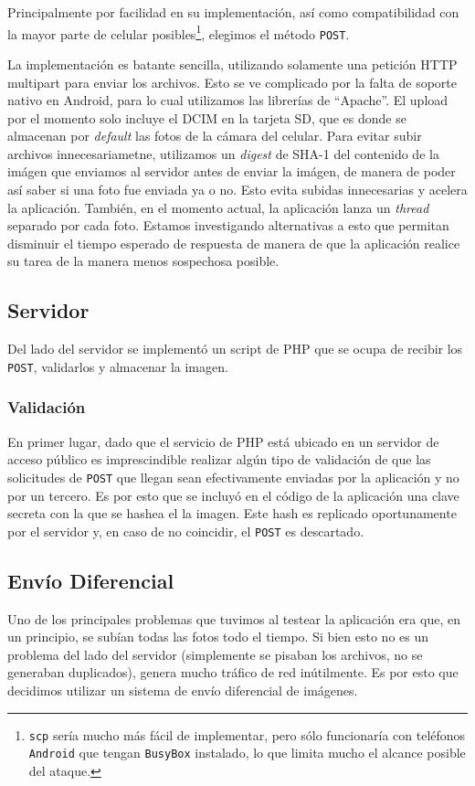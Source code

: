 Principalmente por facilidad en su implementación, así como compatibilidad con la mayor parte de celular posibles\footnote{\texttt{scp} sería mucho más fácil de implementar, pero sólo funcionaría con teléfonos \texttt{Android} que tengan \texttt{BusyBox} instalado, lo que limita mucho el alcance posible del ataque.}, elegimos el método \texttt{POST}.

La implementación es batante sencilla, utilizando solamente una petición HTTP multipart para enviar los archivos. Esto se ve complicado por la falta de soporte nativo en Android, para lo cual utilizamos las librerías de ``Apache''. El upload por el momento solo incluye el DCIM en la tarjeta SD, que es donde se almacenan por \textit{default} las fotos de la cámara del celular. Para evitar subir archivos innecesariametne, utilizamos un \textit{digest} de SHA-1 del contenido de la imágen que enviamos al servidor antes de enviar la imágen, de manera de poder así saber si una foto fue enviada ya o no. Esto evita subidas innecesarias y acelera la aplicación. También, en el momento actual, la aplicación lanza un \textit{thread} separado por cada foto. Estamos investigando alternativas a esto que permitan disminuir el tiempo esperado de respuesta de manera de que la aplicación realice su tarea de la manera menos sospechosa posible.

\subsection{Servidor} %
\label{sub:Servidor}
Del lado del servidor se implementó un script de PHP que se ocupa de recibir los \texttt{POST}, validarlos y almacenar la imagen.

\subsubsection{Validación} %
En primer lugar, dado que el servicio de PHP está ubicado en un servidor de acceso público es imprescindible realizar algún tipo de validación de que las solicitudes de \texttt{POST} que llegan sean efectivamente enviadas por la aplicación y no por un tercero. Es por esto que se incluyó en el código de la aplicación una clave secreta con la que se hashea el la imagen. Este hash es replicado oportunamente por el servidor y, en caso de no coincidir, el \texttt{POST} es descartado.
\label{subsub:Validación}


\subsection{Envío Diferencial} %
\label{ssub:Envío Diferencial}
Uno de los principales problemas que tuvimos al testear la aplicación era que, en un principio, se subían todas las fotos todo el tiempo. Si bien esto no es un problema del lado del servidor (simplemente se pisaban los archivos, no se generaban duplicados), genera mucho tráfico de red inútilmente. Es por esto que decidimos utilizar un sistema de envío diferencial de imágenes. 

